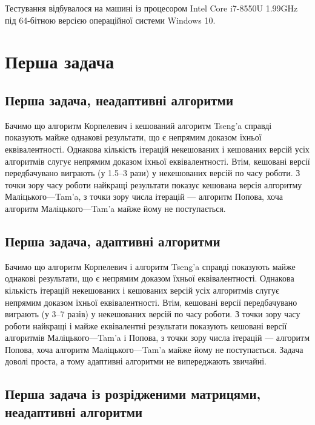 Тестування відбувалося на машині із процесором Intel Core i7-8550U 1.99GHz під 64-бітною версією операційної системи Windows 10.

\section{Перша задача}

\subsection{Перша задача, неадаптивні алгоритми}



Бачимо що алгоритм Корпелевич і кешований алгоритм Tseng'a справді показують майже однакові результати, що є непрямим доказом їхньої еквівалентності. Однакова кількість ітерацій некешованих і кешованих версій усіх алгоритмів слугує непрямим доказом їхньої еквівалентності. Втім, кешовані версії передбачувано виграють (у 1.5--3 рази) у некешованих версій по часу роботи. З точки зору часу роботи найкращі результати показує кешована версія алгоритму Маліцького---Tam'a, з точки зору числа ітерацій --- алгоритм Попова, хоча алгоритм Маліцького---Tam'a майже йому не поступається.

\newpage\subsection{Перша задача, адаптивні алгоритми}



Бачимо що алгоритм Корпелевич і алгоритм Tseng'a справді показують майже однакові результати, що є непрямим доказом їхньої еквівалентності. Однакова кількість ітерацій некешованих і кешованих версій усіх алгоритмів слугує непрямим доказом їхньої еквівалентності. Втім, кешовані версії передбачувано виграють (у 3--7 разів) у некешованих версій по часу роботи. З точки зору часу роботи найкращі і майже еквівалентні результати показують кешовані версії алгоритмів Маліцького---Tam'a і Попова, з точки зору числа ітерацій --- алгоритм Попова, хоча алгоритм Маліцького---Tam'a майже йому не поступається. Задача доволі проста, а тому адаптивні алгоритми не випереджають звичайні.

\newpage\subsection{Перша задача із розрідженими матрицями, неадаптивні алгоритми}

